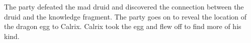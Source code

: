 The party defeated the mad druid and discovered the connection between the druid and the knowledge fragment.
The party goes on to reveal the location of the dragon egg to Calrix.
Calrix took the egg and flew off to find more of his kind.
